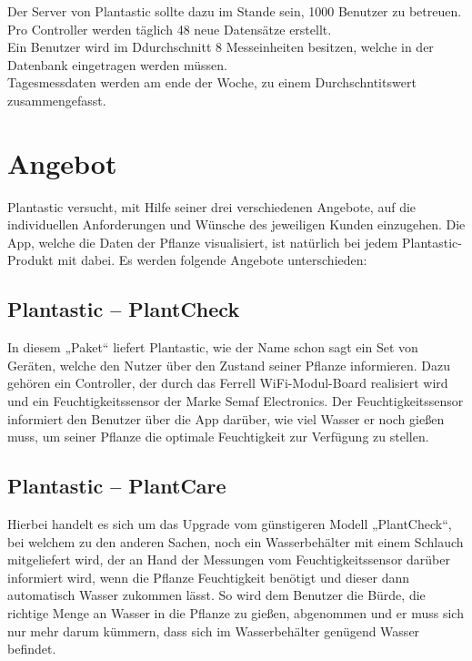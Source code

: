 \documentclass[12pt]{article}
\theoremstyle{definition}
\begin{document}
Der Server von Plantastic sollte dazu im Stande sein, 1000 Benutzer zu betreuen.
Pro Controller werden täglich 48 neue Datensätze erstellt.\\
Ein Benutzer wird im Ddurchschnitt 8 Messeinheiten besitzen, welche in der Datenbank eingetragen werden müssen.\\
Tagesmessdaten werden am ende der Woche, zu einem Durchschntitswert zusammengefasst.

\pagebreak

\section{Angebot}

Plantastic versucht, mit Hilfe seiner drei verschiedenen Angebote, auf die individuellen Anforderungen und Wünsche des jeweiligen Kunden einzugehen. Die App, welche die Daten der Pflanze visualisiert, ist natürlich bei jedem Plantastic-Produkt mit dabei. Es werden folgende Angebote unterschieden:

\subsection{Plantastic – PlantCheck}

In diesem „Paket“ liefert Plantastic, wie der Name schon sagt ein Set von Geräten, welche den Nutzer über den Zustand seiner Pflanze informieren. Dazu gehören ein Controller, der durch das Ferrell WiFi-Modul-Board realisiert wird und ein Feuchtigkeitssensor der Marke Semaf Electronics. Der Feuchtigkeitssensor informiert den Benutzer über die App darüber, wie viel Wasser er noch gießen muss, um seiner Pflanze die optimale Feuchtigkeit zur Verfügung zu stellen.

\subsection{Plantastic – PlantCare}

Hierbei handelt es sich um das Upgrade vom günstigeren Modell „PlantCheck“, bei welchem zu den anderen Sachen, noch ein Wasserbehälter mit einem Schlauch mitgeliefert wird, der an Hand der Messungen vom Feuchtigkeitssensor darüber informiert wird, wenn die Pflanze Feuchtigkeit benötigt und dieser dann automatisch Wasser zukommen lässt. So wird dem Benutzer die Bürde, die richtige Menge an Wasser in die Pflanze zu gießen, abgenommen und er muss sich nur mehr darum kümmern, dass sich im Wasserbehälter genügend Wasser befindet.
\end{document}
